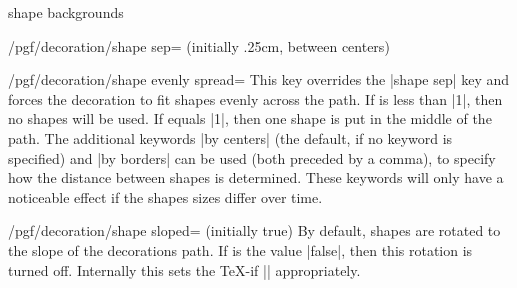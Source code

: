 \begin{decoration}{shape backgrounds}
\begin{key}{/pgf/decoration/shape sep= (initially {.25cm, between centers})}
\begin{codeexample}[]
\end{codeexample}
  \end{key}

  \begin{key}{/pgf/decoration/shape evenly spread=}
    This key overrides the |shape sep| key and forces the decoration to
    fit  shapes evenly across the path.
    If  is less than |1|, then no shapes will be used.
    If  equals |1|, then one shape is put in the middle
    of the path.
    The additional keywords |by centers| (the default, if no keyword is
    specified) and |by borders| can be used (both preceded by a comma),
    to specify how the distance between shapes is determined. These
    keywords will only have a noticeable effect if the shapes sizes
    differ over time.

\begin{codeexample}[]
\end{codeexample}
  \end{key}

  \begin{key}{/pgf/decoration/shape sloped= (initially true)}
    By default, shapes are rotated to the slope of the decorations path. If
     is the value |false|, then this rotation is turned
    off. Internally this sets the \TeX-if |\ifpgfshapedecorationsloped|
    appropriately.


\end{key}
\end{decoration}
